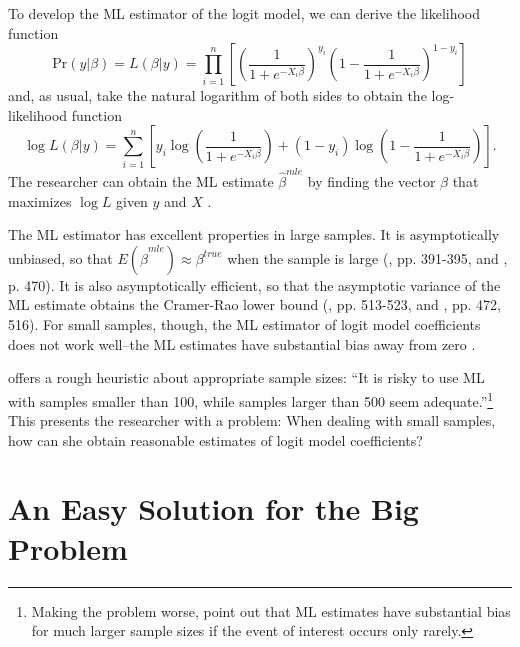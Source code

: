 \documentclass[12pt]{article}
\begin{document}
To develop the ML estimator of the logit model, we can derive the likelihood function
\begin{equation}\nonumber
\text{Pr}(y | \beta) = L(\beta | y) = \displaystyle \prod_{i = 1}^n \left[\left( \dfrac{1}{1 + e^{-X_i\beta}}\right)^{y_i}\left(1- \dfrac{1}{1 + e^{-X_i\beta}}\right)^{1 - y_i}\right]
\end{equation}
\noindent and, as usual, take the natural logarithm of both sides to obtain the log-likelihood function
\begin{equation}\nonumber
\log L(\beta | y) = \displaystyle \sum_{i = 1}^n \left[y_i \log \left( \dfrac{1}{1 + e^{-X_i\beta}}\right) + (1 - y_i) \log \left(1- \dfrac{1}{1 + e^{-X_i\beta}}\right)\right].
\end{equation}
\noindent The researcher can obtain the ML estimate $\hat{\beta}^{mle}$ by finding the vector $\beta$ that maximizes $\log L$ given $y$ and $X$ \citep{King1989}.

The ML estimator has excellent properties in large samples. It is asymptotically unbiased, so that $E(\hat{\beta}^{mle}) \approx \beta^{true}$ when the sample is large (\citealt{Wooldridge2002}, pp. 391-395, and \citealt{CasellaBerger2002}, p. 470). 
It is also asymptotically efficient, so that the asymptotic variance of the ML estimate obtains the Cramer-Rao lower bound (\citealt{Greene2012}, pp. 513-523, and \citealt{CasellaBerger2002}, pp. 472, 516). 
For small samples, though, the ML estimator of logit model coefficients does not work well--the ML estimates have substantial bias away from zero \citep[pp. 53-54]{Long1997}.

\citet[p. 54]{Long1997} offers a rough heuristic about appropriate sample sizes: ``It is risky to use ML with samples smaller than 100, while samples larger than 500 seem adequate.''\footnote{Making the problem worse, \cite{KingZeng2001} point out that ML estimates have substantial bias for much larger sample sizes if the event of interest occurs only rarely.}
This presents the researcher with a problem: When dealing with small samples, how can she obtain reasonable estimates of logit model coefficients?

\section*{An Easy Solution for the Big Problem}
\end{document}
